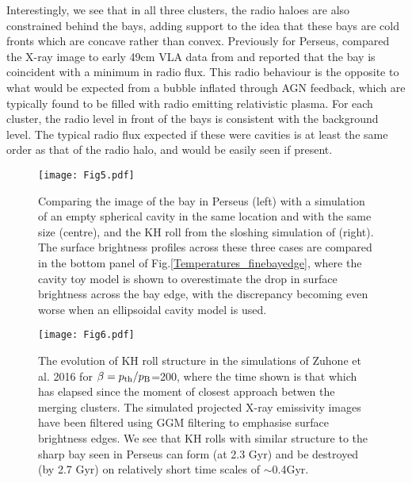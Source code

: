 \documentclass[useAMS,usenatbib]{mn2e}
\begin{document}
Interestingly, we see that in all three clusters, the radio haloes are also
constrained behind the bays, adding support to the idea that these bays are cold
fronts which are concave rather than convex. Previously for
 Perseus, \citet{Fabian2011} compared the X-ray image to early 49cm 
VLA data from \citet{Sijbring1993} and reported that the bay is coincident with a minimum in radio flux. This radio behaviour is the
opposite to what would be expected from a bubble inflated through AGN feedback,
which are typically found to be filled with radio emitting relativistic plasma. For each cluster, the radio level in front of the bays is consistent with the background level. The typical
radio flux expected if these were cavities is at least the same order as that of the radio halo, and would be easily seen if present.

 \begin{figure*}
  \begin{center}
    \leavevmode
\texttt{[image: Fig5.pdf]}
      \caption{Comparing the image of the bay in Perseus (left) with a
simulation of an empty spherical cavity in the same location and with the same
size (centre), and the KH roll from the sloshing simulation of \citet{ZuHone2016}
(right). The surface brightness
profiles across these three cases are compared in the bottom panel of
Fig.\ref{Temperatures_finebayedge}, where the cavity toy model is shown to
overestimate the drop in surface brightness across the bay edge, with the discrepancy becoming even worse when an ellipsoidal cavity model is used.  }
            \label{Compare_Perseus_sloshing_cavity_sim}

  \end{center}
\end{figure*}

\begin{figure*}
  \begin{center}
    \leavevmode
\texttt{[image: Fig6.pdf]}
      \caption{The evolution of KH roll structure in the simulations of Zuhone et
al. 2016 for $\beta= p_{\rm th} / p_{\rm B}$=200, where the time shown is that
which has elapsed since the moment of closest approach betwen the merging clusters. The simulated projected X-ray emissivity images have been filtered using
GGM filtering to emphasise surface brightness edges. We see that KH rolls with
similar structure to the sharp bay seen in Perseus can form (at 2.3 Gyr) and be
destroyed (by 2.7 Gyr) on relatively short time scales of $\sim$0.4Gyr.  }
      \label{GGM_time_ev}
  \end{center}
\end{figure*}
\end{document}

